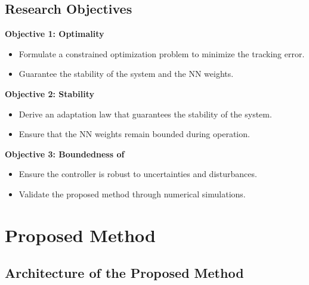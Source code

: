 \documentclass[8pt, aspectratio=169]{beamer}
\begin{document}
\subsection{Research Objectives}

\begin{frame}{\insertsubsectionhead}

  \textbf{Objective 1: Optimality}
  \begin{itemize}
    \item Formulate a constrained optimization problem to minimize the tracking error.
    \item Guarantee the stability of the system and the NN weights.
  \end{itemize}

  \textbf{Objective 2: Stability}
  \begin{itemize}
    \item Derive an adaptation law that guarantees the stability of the system.
    \item Ensure that the NN weights remain bounded during operation.
  \end{itemize}

  \textbf{Objective 3: Boundedness of }
  \begin{itemize}
    \item Ensure the controller is robust to uncertainties and disturbances.
    \item Validate the proposed method through numerical simulations.
  \end{itemize}

\end{frame}

\section{Proposed Method}

\subsection{Architecture of the Proposed Method}
\end{document}

